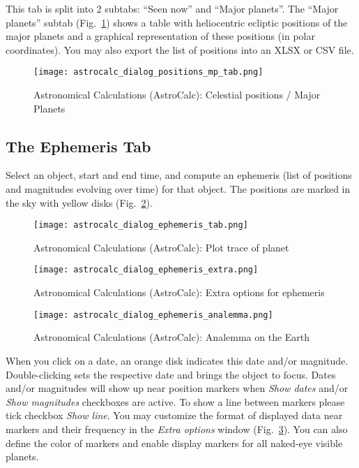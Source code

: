 This tab  is split into 2 subtabs: ``Seen now'' and ``Major planets''.
The ``Major planets'' subtab (Fig.~\ref{fig:gui:AstroCalc:Positions:MajorPlanets}) shows a table
with heliocentric ecliptic positions of the major planets and a graphical representation of these positions
(in polar coordinates). You may also export the list of positions into an XLSX or CSV file.

\begin{figure}[htbp]
	\centering\texttt{[image: astrocalc\_dialog\_positions\_mp\_tab.png]}
	\caption{Astronomical Calculations (AstroCalc): Celestial positions / Major Planets}
	\label{fig:gui:AstroCalc:Positions:MajorPlanets}
\end{figure}

\subsection{The Ephemeris Tab}
\label{sec:gui:AstroCalc:Ephemeris}

Select an object, start and end time, and compute an ephemeris (list of positions and magnitudes evolving over time) for that object. 
The positions are marked in the sky with yellow disks (Fig.~\ref{fig:gui:AstroCalc:Ephemeris}). 

\begin{figure}[p]
	\centering\texttt{[image: astrocalc\_dialog\_ephemeris\_tab.png]}
	\caption{Astronomical Calculations (AstroCalc): Plot trace of planet}
	\label{fig:gui:AstroCalc:Ephemeris}
\end{figure}

\begin{figure}[p]
	\centering\texttt{[image: astrocalc\_dialog\_ephemeris\_extra.png]}
	\caption{Astronomical Calculations (AstroCalc): Extra options for ephemeris}
	\label{fig:gui:AstroCalc:Ephemeris:Extra}
\end{figure}

\begin{figure}[p]
	\centering\texttt{[image: astrocalc\_dialog\_ephemeris\_analemma.png]}
	\caption{Astronomical Calculations (AstroCalc): Analemma on the Earth}
	\label{fig:gui:AstroCalc:Ephemeris:Analemma}
\end{figure}


When you click on a date, an orange disk indicates this date and/or magnitude. 
Double-clicking sets the respective date and brings the object to focus. 
Dates and/or magnitudes will show up near position markers when \emph{Show dates} 
and/or \emph{Show magnitudes} checkboxes are active.  
To show a line between markers please tick checkbox \emph{Show line}. 
You may customize the format of displayed data near markers and their frequency in the \emph{Extra options} window (Fig.~\ref{fig:gui:AstroCalc:Ephemeris:Extra}).
You can also define the color of markers and enable display markers for all naked-eye visible planets.


